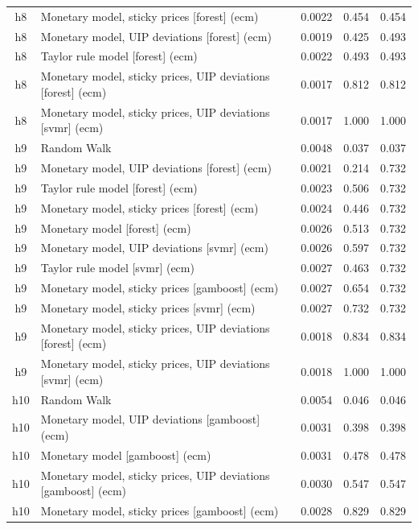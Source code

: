 \begin{ThreePartTable}
\begin{longtable}[t]{cp{5.5cm}ccc}
h8 & \raggedright Monetary model, sticky prices [forest] (ecm) & 0.0022 & 0.454 & 0.454\\
h8 & \raggedright Monetary model, UIP deviations [forest] (ecm) & 0.0019 & 0.425 & 0.493\\
h8 & \raggedright Taylor rule model [forest] (ecm) & 0.0022 & 0.493 & 0.493\\
h8 & \raggedright Monetary model, sticky prices, UIP deviations [forest] (ecm) & 0.0017 & 0.812 & 0.812\\
h8 & \raggedright Monetary model, sticky prices, UIP deviations [svmr] (ecm) & 0.0017 & 1.000 & 1.000\\
\addlinespace
h9 & \raggedright Random Walk & 0.0048 & 0.037 & 0.037\\
h9 & \raggedright Monetary model, UIP deviations [forest] (ecm) & 0.0021 & 0.214 & 0.732\\
h9 & \raggedright Taylor rule model [forest] (ecm) & 0.0023 & 0.506 & 0.732\\
h9 & \raggedright Monetary model, sticky prices [forest] (ecm) & 0.0024 & 0.446 & 0.732\\
h9 & \raggedright Monetary model [forest] (ecm) & 0.0026 & 0.513 & 0.732\\
h9 & \raggedright Monetary model, UIP deviations [svmr] (ecm) & 0.0026 & 0.597 & 0.732\\
h9 & \raggedright Taylor rule model [svmr] (ecm) & 0.0027 & 0.463 & 0.732\\
h9 & \raggedright Monetary model, sticky prices [gamboost] (ecm) & 0.0027 & 0.654 & 0.732\\
h9 & \raggedright Monetary model, sticky prices [svmr] (ecm) & 0.0027 & 0.732 & 0.732\\
h9 & \raggedright Monetary model, sticky prices, UIP deviations [forest] (ecm) & 0.0018 & 0.834 & 0.834\\
h9 & \raggedright Monetary model, sticky prices, UIP deviations [svmr] (ecm) & 0.0018 & 1.000 & 1.000\\
\addlinespace
h10 & \raggedright Random Walk & 0.0054 & 0.046 & 0.046\\
h10 & \raggedright Monetary model, UIP deviations [gamboost] (ecm) & 0.0031 & 0.398 & 0.398\\
h10 & \raggedright Monetary model [gamboost] (ecm) & 0.0031 & 0.478 & 0.478\\
h10 & \raggedright Monetary model, sticky prices, UIP deviations [gamboost] (ecm) & 0.0030 & 0.547 & 0.547\\
h10 & \raggedright Monetary model, sticky prices [gamboost] (ecm) & 0.0028 & 0.829 & 0.829\\

\end{longtable}
\end{ThreePartTable}
